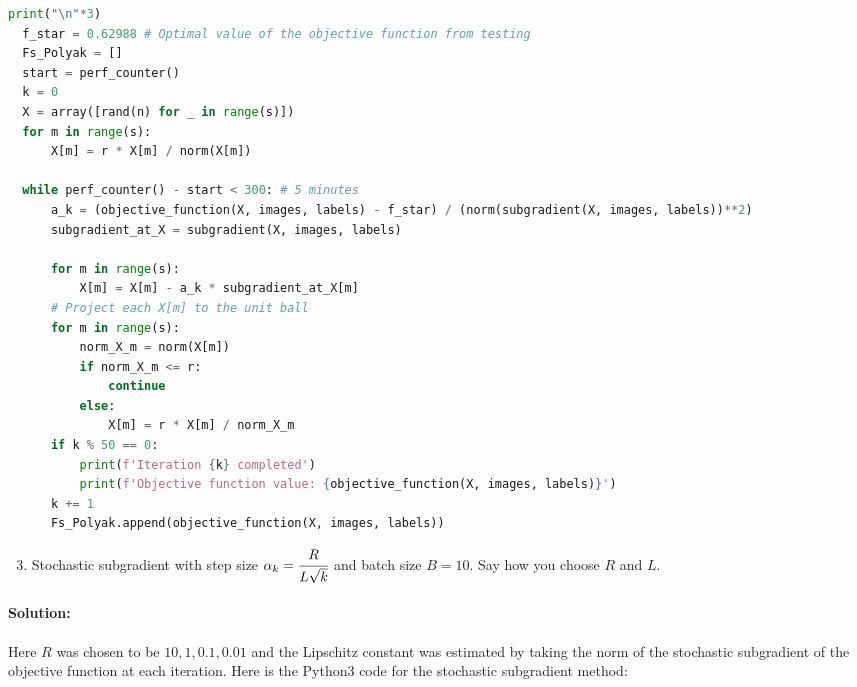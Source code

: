 \documentclass[10pt]{article}
\begin{document}
\begin{lstlisting}[language=Python]
  print("\n"*3)
  f_star = 0.62988 # Optimal value of the objective function from testing
  Fs_Polyak = []
  start = perf_counter()
  k = 0
  X = array([rand(n) for _ in range(s)])
  for m in range(s):
      X[m] = r * X[m] / norm(X[m])
  
  while perf_counter() - start < 300: # 5 minutes
      a_k = (objective_function(X, images, labels) - f_star) / (norm(subgradient(X, images, labels))**2)
      subgradient_at_X = subgradient(X, images, labels)
  
      for m in range(s):
          X[m] = X[m] - a_k * subgradient_at_X[m]
      # Project each X[m] to the unit ball
      for m in range(s):
          norm_X_m = norm(X[m])
          if norm_X_m <= r:
              continue
          else:
              X[m] = r * X[m] / norm_X_m
      if k % 50 == 0:
          print(f'Iteration {k} completed')
          print(f'Objective function value: {objective_function(X, images, labels)}')
      k += 1
      Fs_Polyak.append(objective_function(X, images, labels))
\end{lstlisting}

\begin{enumerate}[label=\alph*)]
  \setcounter{enumi}{2}
  \item Stochastic subgradient with step size $\alpha_k = \cfrac{R}{L \sqrt{k}}$ and batch size $B=10$. Say how you choose $R$ and $L$.
\end{enumerate}

\paragraph{Solution:}

Here $R$ was chosen to be $10, 1, 0.1, 0.01$ and the Lipschitz constant was estimated by taking the norm of the stochastic subgradient of the objective function at each iteration. Here is the Python3 code for the stochastic subgradient method:
\end{document}
